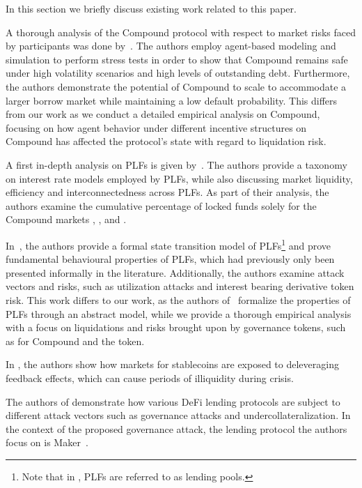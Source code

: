 In this section we briefly discuss existing work related to this paper.

A thorough analysis of the Compound protocol with respect to market risks faced by participants was done by~\cite{Kao2020}.
The authors employ agent-based modeling and simulation to perform stress tests in order to show that Compound remains safe under high volatility scenarios and high levels of outstanding debt.
Furthermore, the authors demonstrate the potential of Compound to scale to accommodate a larger borrow market while maintaining a low default probability.
This differs from our work as we conduct a detailed empirical analysis on Compound, focusing on how agent behavior under different incentive structures on Compound has affected the protocol's state with regard to liquidation risk.  

A first in-depth analysis on PLFs is given by~\cite{gudgeon2020defi}.
The authors provide a taxonomy on interest rate models employed by PLFs, while also discussing market liquidity, efficiency and interconnectedness across PLFs.
As part of their analysis, the authors examine the cumulative percentage of locked funds solely for the Compound markets , , and .

In~\cite{bartoletti2020sok}, the authors provide a formal state transition model of PLFs\footnote{Note that in \cite{bartoletti2020sok}, PLFs are referred to as lending pools.} and prove fundamental behavioural properties of PLFs, which had previously only been presented informally in the literature.
Additionally, the authors examine attack vectors and risks, such as utilization attacks and interest bearing derivative token risk. 
This work differs to our work, as the authors of~\cite{bartoletti2020sok} formalize the properties of PLFs through an abstract model, while we provide a thorough empirical analysis with a focus on liquidations and risks brought upon by governance tokens, such as for Compound and the  token.

In \cite{klages2019stability}, the authors show how markets for stablecoins are exposed to deleveraging feedback effects, which can cause periods of illiquidity during crisis.

The authors of \cite{gudgeon2020decentralized} demonstrate how various DeFi lending protocols are subject to different attack vectors such as governance attacks and undercollateralization.
In the context of the proposed governance attack, the lending protocol the authors focus on is Maker~\cite{whitepaper:maker}.

